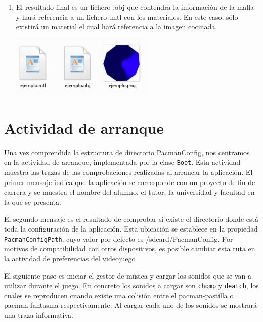 \begin{enumerate}
\item El resultado final es un fichero .obj que contendrá la información de la malla y hará referencia a un fichero .mtl con los materiales. En este caso, sólo existirá un material el cual hará referencia a la imagen cocinada.

   \begin{minipage}{\linewidth}
         \centering
          \includegraphics[height=3cm]{img/blender/blender12.jpg} 
    \end{minipage}

\end{enumerate}

\section{Actividad de arranque}

Una vez comprendida la estructura de directorio PacmanConfig, nos centramos en la actividad de arranque, implementada por la clase \texttt{Boot}. Esta actividad muestra las trazas de las comprobaciones realizadas al arrancar la aplicación. El primer mensaje indica que la aplicación se corresponde con un proyecto de fin de carrera y se muestra el nombre del alumno, el tutor, la universidad y facultad en la que se presenta. 
\newline

El segundo mensaje es el resultado de comprobar si existe el directorio donde está toda la configuración de la aplicación. Esta ubicación se establece en la propiedad \texttt{PacmanConfigPath}, cuyo valor por defecto es /sdcard/PacmanConfig. Por motivos de compatibilidad con otros dispositivos, es posible cambiar esta ruta en la actividad de preferencias del videojuego 
\newline

El siguiente paso es iniciar el gestor de música y cargar los sonidos que se van a utilizar durante el juego. En concreto los sonidos a cargar son \texttt{chomp} y \texttt{deatch}, los cuales se reproducen cuando existe una colisión entre el pacman-pastilla o pacman-fantasma respectivamente. Al cargar cada uno de los sonidos se mostrará una traza informativa.
\newline

